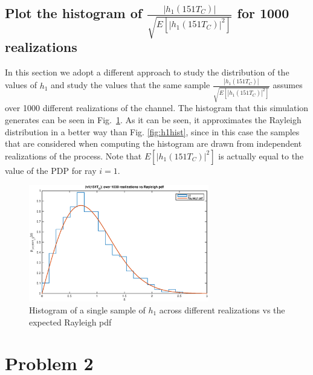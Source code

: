 \documentclass[10pt]{article}
\begin{document}
\subsection*{Plot the histogram of $\frac{|h_1(151T_C)|}{\sqrt{E[|h_1(151T_C)|^2]}}$ for 1000 realizations}
In this section we adopt a different approach to study the distribution of the values of $h_1$ and study the values that the same sample $\frac{|h_1(151T_C)|}{\sqrt{E[|h_1(151T_C)|^2]}}$ assumes over 1000 different realizations of the channel. The histogram that this simulation generates can be seen in Fig.~\ref{fig:h1hist1000realizations}. As it can be seen, it approximates the Rayleigh distribution in a better way than Fig. \ref{fig:h1hist}, since in this case the samples that are considered when computing the histogram are drawn from independent realizations of the process. Note that $E[|h_1(151T_C)|^2]$ is actually equal to the value of the PDP for ray $i=1$.

\begin{figure}[h!]
  \centering
  \includegraphics[width = 0.7\textwidth]{p03_h1hist}
  \caption{Histogram of a single sample of $h_1$ across different realizations vs the expected Rayleigh pdf}
  \label{fig:h1hist1000realizations}
\end{figure}


\clearpage

\section*{Problem 2}
\end{document}
